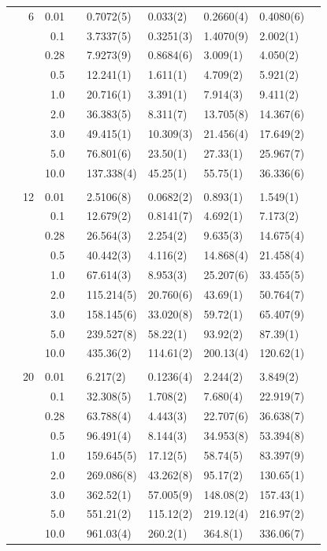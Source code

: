 \begin{table}[H]
\begin{tabularx}{\textwidth}{R{1cm}rrcR{2.3cm}R{2.3cm}R{2.3cm}R{2.3cm}R{1cm}}
		&6 & 0.01 && 0.7072(5) & 0.033(2) & 0.2660(4) & 0.4080(6) \\
		&& 0.1 && 3.7337(5) & 0.3251(3) & 1.4070(9) & 2.002(1) \\
		&& 0.28 && 7.9273(9) & 0.8684(6) & 3.009(1) & 4.050(2) \\
		&& 0.5 && 12.241(1) & 1.611(1) & 4.709(2) & 5.921(2)\\
		&& 1.0 && 20.716(1) & 3.391(1) & 7.914(3) & 9.411(2)\\
		&& 2.0 && 36.383(5) & 8.311(7) & 13.705(8) & 14.367(6) \\
		&& 3.0 && 49.415(1) & 10.309(3) & 21.456(4) & 17.649(2) \\ 
		&& 5.0 && 76.801(6) & 23.50(1) & 27.33(1) & 25.967(7) \\
		&& 10.0 && 137.338(4) & 45.25(1) & 55.75(1) & 36.336(6) \\
		\hline \\
		
		&12 & 0.01 && 2.5106(8) & 0.0682(2) & 0.893(1) & 1.549(1) \\
		&& 0.1 && 12.679(2) & 0.8141(7) & 4.692(1) & 7.173(2) \\
		&& 0.28 && 26.564(3) & 2.254(2) & 9.635(3) & 14.675(4) \\
		&& 0.5 && 40.442(3) & 4.116(2) & 14.868(4) & 21.458(4) \\
		&& 1.0 && 67.614(3) & 8.953(3) & 25.207(6) & 33.455(5) \\
		&& 2.0 && 115.214(5) & 20.760(6) & 43.69(1) & 50.764(7) \\
		&& 3.0 && 158.145(6) & 33.020(8) & 59.72(1) & 65.407(9) \\ 
		&& 5.0 && 239.527(8) & 58.22(1) & 93.92(2) & 87.39(1) \\
		&& 10.0 && 435.36(2) & 114.61(2) & 200.13(4) & 120.62(1) \\
		\hline \\
		
		&20 & 0.01 && 6.217(2) & 0.1236(4) & 2.244(2) & 3.849(2) \\
		&& 0.1 && 32.308(5) & 1.708(2) & 7.680(4) & 22.919(7) \\
		&& 0.28 && 63.788(4) & 4.443(3) & 22.707(6) & 36.638(7) \\
		&& 0.5 && 96.491(4) & 8.144(3) & 34.953(8) & 53.394(8) \\
		&& 1.0 && 159.645(5) & 17.12(5) & 58.74(5) & 83.397(9) \\
		&& 2.0 && 269.086(8) & 43.262(8) & 95.17(2) & 130.65(1) \\
		&& 3.0 && 362.52(1) & 57.005(9) & 148.08(2) & 157.43(1) \\ 
		&& 5.0 && 551.21(2) & 115.12(2) & 219.12(4) & 216.97(2) \\
		&& 10.0 && 961.03(4) & 260.2(1) & 364.8(1) & 336.06(7) \\
		\hline \hline
	\end{tabularx}
\end{table} 

